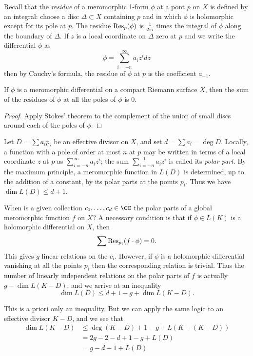 Recall that the \emph{residue} of a meromorphic 1-form $\phi$ at a pont $p$ on $X$ is defined by an integral: choose a disc $\Delta \subset X$ containing $p$ and in which $\phi$ is holomorphic except for its pole at $p$. The residue ${\rm Res}_p(\phi)$ is $\frac{1}{2\pi i}$ times the integral of $\phi$ along the boundary of $\Delta$. If $z$ is a local coordinate on $\Delta$ zero at $p$ and we write the differential $\phi$ as
$$
\phi = \sum_{i=-n}^\infty a_iz^i dz
$$
then by Cauchy's formula, the residue of $\phi$ at $p$ is the coefficient $a_{-1}$. 

\begin{proposition}\label{residue sum}
 If $\phi$ is a meromorphic differential on a compact Riemann surface $X$, then the sum of the residues of $\phi$
 at all the poles of $\phi$ is 0.
 \end{proposition}
 
\begin{proof}
Apply Stokes' theorem to the complement of the union of small discs around each of the poles of $\phi$.
\end{proof}

Let  $D = \sum a_ip_i$ be an effective divisor on $X$, and set $d = \sum a_i = \deg D$. Locally, a function with a pole of order at most $n$ at $p$ may be written in terms of a local coordinate $z$ at $p$ as $\sum_{i=-n}^\infty a_{i}z^{i} $;
the sum $\sum_{i=-n}^{-1} a_{i}z^{i}$ is called its \emph{polar part}.
By the maximum principle, a meromorphic function in $L(D)$ is determined, up to the addition of a constant, by its polar parts at the points $p_i$. Thus we have $\dim L(D) \leq d+1$.

When is a given collection $c_1,\dots,c_d \in \CC$ the polar parts of a global meromorphic function $f$ on $X$? A necessary condition
is that if $\phi \in L(K)$ is a holomorphic differential on $X$, then
$$
\sum {\rm Res}_{p_i}(f \cdot \phi) = 0.
$$
This gives $g$ linear relations on the $c_i$. However, if $\phi$ is a holomorphic differential vanishing at all the points $p_i$
then the corresponding relation is trivial. Thus the number of linearly independent relations on the polar parts of $f$ is actually $g - \dim L(K-D)$; and we arrive at an inequality
$$
\dim L(D) \leq d + 1 - g + \dim L(K-D).
$$

This is a priori only an inequality. But we can apply the same logic to an effective divisor $K-D$, and we see that
\begin{align*}
\dim L(K-D) &\leq \deg(K-D) + 1 - g + L(K - (K-D)) \\
& = 2g - 2 - d + 1 - g  + L(D) \\
&= g - d - 1 + L(D)
\end{align*}

